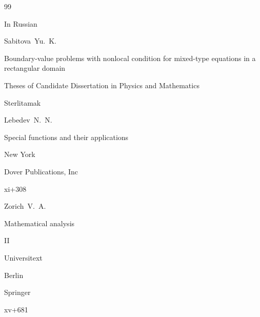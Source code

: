 \begin{thebibliography}{99}

\lang In Russian

\by Sabitova~Yu.~K.

\thesis Boundary-value problems with nonlocal condition for mixed-type equations in a rectangular domain

\thesisinfo Theses of Candidate Dissertation in Physics and Mathematics

\publaddr Sterlitamak 












\by Lebedev~N.~N.

\book Special functions and their applications

\publaddr New York

\publ Dover Publications, Inc

\totalpages xi+308 








\by Zorich~V.~A.

\book Mathematical analysis 

\bookvol II

\serial Universitext

\publaddr Berlin


\publ Springer 

\totalpages xv+681 






\end{thebibliography}



\EngDate





\newpage\Russian



%

%

%

